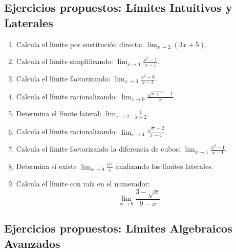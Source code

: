 \documentclass[12pt, letterpaper]{article}
\begin{document}
\subsection{Ejercicios propuestos: Límites Intuitivos y Laterales}

\begin{enumerate}[resume=ejercicios, leftmargin=*]
  \item \facil{} Calcula el límite por sustitución directa: $\displaystyle\lim_{x \to 2} (3x + 5)$.

  \item \facil{} Calcula el límite simplificando: $\displaystyle\lim_{x \to 1} \frac{x^2 - 1}{x - 1}$.

  \item \medio{} Calcula el límite factorizando: $\displaystyle\lim_{x \to 3} \frac{x^2 - 9}{x - 3}$.

  \item \medio{} Calcula el límite racionalizando: $\displaystyle\lim_{x \to 0} \frac{\sqrt{x + 1} - 1}{x}$.

  \item \medio{} Determina el límite lateral: $\displaystyle\lim_{x \to 2^-} \frac{1}{x - 2}$.

  \item \dificil{} Calcula el límite racionalizando: $\displaystyle\lim_{x \to 4} \frac{\sqrt{x} - 2}{x - 4}$.

  \item \dificil{} Calcula el límite factorizando la diferencia de cubos: $\displaystyle\lim_{x \to 1} \frac{x^3 - 1}{x - 1}$.

  \item \dificil{} Determina si existe $\displaystyle\lim_{x \to 0} \frac{|x|}{x}$ analizando los límites laterales.

  \item \muyDificil{} Calcula el límite con raíz en el numerador:
        $$\lim_{x \to 9} \frac{3 - \sqrt{x}}{9 - x}$$
\end{enumerate}

\subsection{Ejercicios propuestos: Límites Algebraicos Avanzados}
\end{document}
